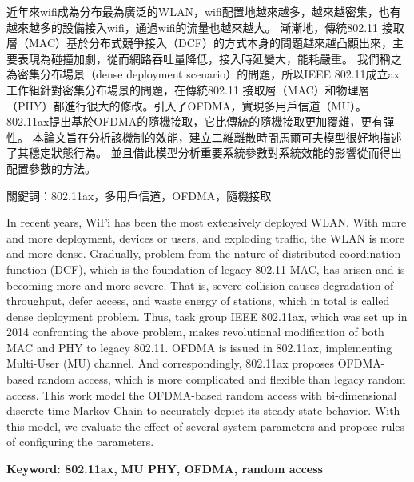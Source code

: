 \begin{abstractzh}
近年來wifi成為分布最為廣泛的WLAN，wifi配置地越來越多，越來越密集，也有越來越多的設備接入wifi，通過wifi的流量也越來越大。
漸漸地，傳統802.11 接取層（MAC）基於分布式競爭接入（DCF）的方式本身的問題越來越凸顯出來，主要表現為碰撞加劇，從而網路吞吐量降低，接入時延變大，能耗嚴重。
我們稱之為密集分布場景（dense deployment scenario）的問題，所以IEEE 802.11成立ax工作組針對密集分布場景的問題，在傳統802.11 接取層（MAC）和物理層（PHY）都進行很大的修改。引入了OFDMA，實現多用戶信道（MU）。
802.11ax提出基於OFDMA的隨機接取，它比傳統的隨機接取更加覆雜，更有彈性。
本論文旨在分析該機制的效能，建立二維離散時間馬爾可夫模型很好地描述了其穩定狀態行為。
並且借此模型分析重要系統參數對系統效能的影響從而得出配置參數的方法。

\noindent
關鍵詞：802.11ax，多用戶信道，OFDMA，隨機接取
\end{abstractzh}

\begin{abstracten}
In recent years, WiFi has been the most extensively deployed WLAN. 
With more and more deployment, devices or users, and exploding traffic, the WLAN is more and more dense. 
Gradually, problem from the nature of distributed coordination function (DCF), which is the foundation of legacy 802.11 MAC, has arisen and is becoming more and more severe. 
That is, severe collision causes degradation of throughput, defer access, and waste energy of stations, which in total is called dense deployment problem. 
Thus, task group IEEE 802.11ax, which was set up in 2014 confronting the above problem, makes revolutional modification of both MAC and PHY to legacy 802.11. 
OFDMA is issued in 802.11ax, implementing Multi-User (MU) channel. 
And correspondingly, 802.11ax proposes OFDMA-based random access, which is more complicated and flexible than legacy random access. 
This work model the OFDMA-based random access with bi-dimensional discrete-time Markov Chain to accurately depict its steady state behavior. 
With this model, we evaluate the effect of several system parameters and propose rules of configuring the parameters.



\noindent
\textbf{Keyword: 802.11ax, MU PHY, OFDMA, random access}
\end{abstracten}

\begin{comment}
\category{I2.10}{Computing Methodologies}{Artificial Intelligence --
Vision and Scene Understanding} \category{H5.3}{Information
Systems}{Information Interfaces and Presentation (HCI) -- Web-based
Interaction.}

\terms{Design, Human factors, Performance.}

\keywords{802.11ax, MU PHY, OFDMA, random access}
\end{comment}
